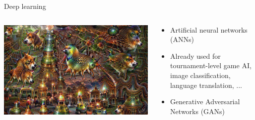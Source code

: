 \begin{frame}{Deep learning}
	\begin{columns}
		\begin{column}{0.4\textwidth}
			\pause\includegraphics[width=\textwidth]{deepdream}
		\end{column}
		\begin{column}{0.55\textwidth}
			\begin{itemize}
				\pause\item Artificial neural networks (ANNs)
				\pause\item Already used for tournament-level game AI, image classification, language translation, ...
				\pause\item Generative Adversarial Networks (GANs)
			\end{itemize}
		\end{column}
	\end{columns}
\end{frame}

